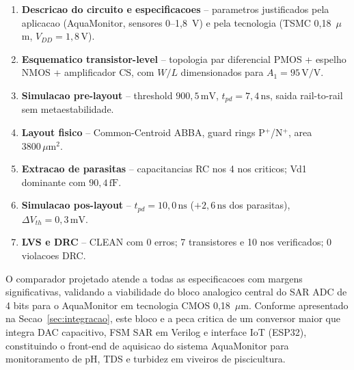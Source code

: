 \documentclass[12pt, a4paper]{article}
\begin{document}
\begin{enumerate}[noitemsep]
  \item \checkmark \textbf{Descricao do circuito e especificacoes} -- parametros
        justificados pela aplicacao (AquaMonitor, sensores 0--1{,}8~V) e pela tecnologia
        (TSMC 0{,}18~$\mu$m, $V_{DD}=1{,}8\,\text{V}$).
  \item \checkmark \textbf{Esquematico transistor-level} -- topologia par diferencial
        PMOS + espelho NMOS + amplificador CS, com $W/L$ dimensionados para
        $A_1 = 95\,\text{V/V}$.
  \item \checkmark \textbf{Simulacao pre-layout} -- threshold $900{,}5\,\text{mV}$,
        $t_{pd} = 7{,}4\,\text{ns}$, saida rail-to-rail sem metaestabilidade.
  \item \checkmark \textbf{Layout fisico} -- Common-Centroid ABBA, guard rings P$^+$/N$^+$,
        area $3800\,\mu\text{m}^2$.
  \item \checkmark \textbf{Extracao de parasitas} -- capacitancias RC nos 4 nos criticos;
        Vd1 dominante com $90{,}4\,\text{fF}$.
  \item \checkmark \textbf{Simulacao pos-layout} -- $t_{pd} = 10{,}0\,\text{ns}$
        ($+2{,}6\,\text{ns}$ dos parasitas), $\Delta V_{th} = 0{,}3\,\text{mV}$.
  \item \checkmark \textbf{LVS e DRC} -- CLEAN com 0 erros; 7 transistores e 10 nos
        verificados; 0 violacoes DRC.
\end{enumerate}

O comparador projetado atende a todas as especificacoes com margens significativas,
validando a viabilidade do bloco analogico central do SAR ADC de 4 bits para o
AquaMonitor em tecnologia CMOS 0{,}18~$\mu$m. Conforme apresentado na
Secao~\ref{sec:integracao}, este bloco e a peca critica de um conversor maior
que integra DAC capacitivo, FSM SAR em Verilog e interface IoT (ESP32),
constituindo o front-end de aquisicao do sistema AquaMonitor para monitoramento
de pH, TDS e turbidez em viveiros de piscicultura.
\end{document}
